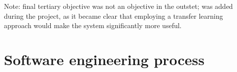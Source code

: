 \documentclass[../main.tex]{subfiles}
\begin{document}
Note: final tertiary objective was not an objective in the outstet; was added during the project, as it became clear that employing a transfer learning approach would make the system significantly more useful.


% 

\section{Software engineering process}






\end{document}
